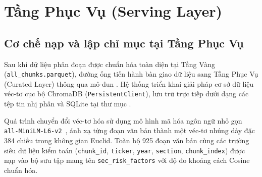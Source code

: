 \section{Tầng Phục Vụ (Serving Layer)}

\subsection{Cơ chế nạp và lập chỉ mục tại Tầng Phục Vụ}
Sau khi dữ liệu phân đoạn được chuẩn hóa toàn diện tại Tầng Vàng (\texttt{all\_chunks.parquet}), đường ống tiến hành bàn giao dữ liệu sang Tầng Phục Vụ (Curated Layer) thông qua mô-đun . Hệ thống triển khai giải pháp cơ sở dữ liệu véc-tơ cục bộ ChromaDB (\texttt{PersistentClient}), lưu trữ trực tiếp dưới dạng các tệp tin nhị phân và SQLite tại thư mục .

Quá trình chuyển đổi véc-tơ hóa sử dụng mô hình mã hóa ngôn ngữ nhỏ gọn \texttt{all-MiniLM-L6-v2}~\cite{reimers2019sentence}, ánh xạ từng đoạn văn bản thành một véc-tơ nhúng dày đặc 384 chiều trong không gian Euclid. Toàn bộ 925 đoạn văn bản cùng các trường siêu dữ liệu kiểm toán (\texttt{chunk\_id}, \texttt{ticker}, \texttt{year}, \texttt{section}, \texttt{chunk\_index}) được nạp vào bộ sưu tập mang tên \mbox{\texttt{sec\_risk\_factors}} với độ đo khoảng cách Cosine chuẩn hóa.


